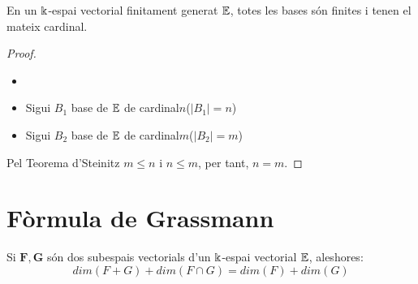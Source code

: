\begin{col}
En un $\Bbbk$-espai vectorial finitament generat $\mathbb{E}$, totes les bases són finites i tenen el mateix cardinal.
\end{col}

\begin{proof}
\begin{itemize}
    \item[]
    \item Sigui $B_1$ base de $\mathbb{E}$  de cardinal$n$($|B_1| = n$)
    \item Sigui $B_2$ base de $\mathbb{E}$ de cardinal$m$($|B_2| = m$)
\end{itemize}
\noindent
Pel Teorema d'Steinitz $m \leq n$ i $n \leq m$, per tant, $n=m$.
\end{proof}


\section{Fòrmula de Grassmann}
Si $\mathbf{F} , \mathbf{G}$ són dos subespais vectorials d'un $\Bbbk$-espai vectorial $\mathbb{E}$, aleshores:
$$ dim(F + G) + dim(F \cap G) = dim(F) + dim(G) $$

